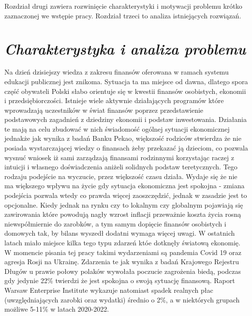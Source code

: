 \documentclass[a4paper,10pt, twoside]{report}
\newcommand{\customstylechapter}[1]{\large{\textit{#1}}}
\begin{document}
\medskip
{Rozdział drugi zawiera rozwinięcie charakterystyki i motywacji problemu krótko 
zaznaczonej we wstępie pracy. Rozdział trzeci to analiza istniejących rozwiązań.}

\chapter{\customstylechapter{Charakterystyka i analiza problemu}}

{Na dzień dzisiejszy wiedza z zakresu finansów oferowana w ramach systemu 
edukacji publicznej jest znikoma\cite{edukacjafinansowawszkołach}. Sytuacja ta 
ma miejsce od dawna, dlatego spora część obywateli Polski słabo orientuje się w 
kwestii finansów osobistych, ekonomii i przedsiębiorczości. Istnieje wiele 
aktywnie działających programów które wprowadzają uczestników w świat finansów 
poprzez przedstawienie podstawowych zagadnień z dziedziny ekonomii i podstaw 
inwestowania\cite{edukacjafinansowawszkołach}. Działania te mają na celu 
zbudować w nich świadomość ogólnej sytuacji ekonomicznej jednakże jak wynika z 
badań Banku Pekao\cite{edukacjafinansowamlodziezy}, większość rodziców stwierdza
 że nie posiada wystarczającej wiedzy o finansach żeby przekazać ją dzieciom, 
co pozwala wysnuć wniosek iż sami zarządzają finansami rodzinnymi korzystając 
raczej z intuicji i własnego doświadczenia aniżeli solidnych podstaw 
teretycznych. Tego rodzaju podejście na wyczucie, przez większość czasu działa. 
Wydaje się że nie ma większego wpływu na życie gdy sytuacja ekonomiczna jest 
spokojna - zmiana podejścia pozwala wtedy co prawda więcej zaoszczędzić, jednak 
w zasadzie jest to opcjonalne. Kiedy jednak na rynku czy to lokalnym czy 
globalnym pojawiają się zawirowania które powodują nagły wzrost inflacji 
przeważnie koszta życia rosną niewspółmiernie do 
zarobków\cite{gussytuacjabudzetowa}, a tym samym dopięcie finansów osobistych i 
domowych tak, by bilans wyszedł dodatni wymaga więcej uwagi. W ostatnich latach 
miało miejsce kilka tego typu zdarzeń któe dotknęły światową ekonomię. W 
momencie pisania tej pracy takimi wydarzeniami są pandemia Covid 19 oraz agresja
 Rosji na Ukrainę. Zdarzenia te jak wynika z badań Krajowego Rejestru Długów 
\cite{portfelpolakawpandemii} u prawie połowy polaków wywołała poczucie 
zagrożenia biedą, podczas gdy jedynie 22\% twierdzi że jest spokojna o swoją 
sytuację finansową. Raport Warsaw Enterprise Institute \cite{weiinflacja} 
wykazuje natomiast spadek realnych płac (uwzględniających zarobki oraz wydatki) 
średnio o 2\%, a w niektórych grupach możliwe 5-11\% w latach 2020-2022.}
\end{document}

